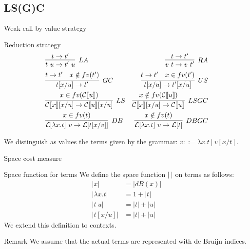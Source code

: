 \documentclass[dvipsnames]{beamer}
\begin{document}
\subsection*{LS(G)C}
\begin{frame}{Weak call by value strategy}
    \begin{block}{Reduction strategy} 
    \begin{align*}
    &\infer[LA]{t~u\rightarrow t'~u}{t \rightarrow t'}
 &\infer[RA]{v~t\rightarrow v~t'}{t \rightarrow t'}\\
&\infer[GC]{t[x/u]\rightarrow t'}{t \rightarrow t' & x \notin fv(t') }
&\infer[US]{t[x/u]\rightarrow t'[x/u]}{t \rightarrow t' & x \in fv(t')}\\
&\infer[LS]{\mathcal{C}\llbracket x \rrbracket [x/u]\rightarrow \mathcal{C}\llbracket u \rrbracket [x/u]}{x \in fv(\mathcal{C}\llbracket u \rrbracket) }
&\infer[LSGC]{\mathcal{C}\llbracket x \rrbracket [x/u]\rightarrow \mathcal{C}\llbracket u \rrbracket}{x \notin fv(\mathcal{C}\llbracket u \rrbracket) }\\
&\infer[DB]{\mathcal{L}[\lambda x.t]~v \rightarrow \mathcal{L}[t[x/v]]}{x\in fv(t)}
&\infer[DBGC]{\mathcal{L}[\lambda x.t]~v \rightarrow \mathcal{L}[t]}{x\notin fv(t)}
\end{align*}
  \end{block}
  We distinguish as values the terms given by the grammar: $v ::= \lambda x.t~|~v[x/t]$.
\end{frame}


\begin{frame}{Space cost measure}
  \begin{alertblock}{Space function for terms}
    We define the space function $|~|$ on terms as follows:
  \begin{align*}
    |x| &= |dB(x)|\\
    |\lambda x.t| &= 1 + |t|\\
    |t~u| &= |t|+|u|\\
    |t[x/u]| &= |t|+|u|
  \end{align*}
  We extend this definition to contexts.
  \end{alertblock}
  \begin{block}{Remark}
    We assume that the actual terms are represented with de Bruijn indices.
  \end{block}
\end{frame}
\end{document}
